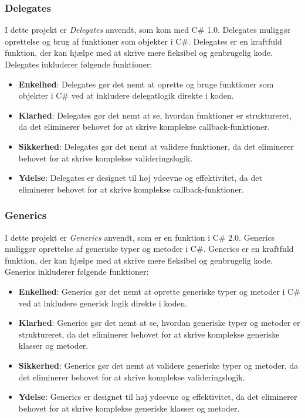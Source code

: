 \subsubsection{Delegates}
I dette projekt er \emph{Delegates} anvendt, som kom med C\# 1.0. Delegates muliggør oprettelse og brug af funktioner som objekter i C\#. Delegates er en kraftfuld funktion, der kan hjælpe med at skrive mere fleksibel og genbrugelig kode. Delegates inkluderer følgende funktioner:
\begin{itemize}
\item \textbf{Enkelhed}: Delegates gør det nemt at oprette og bruge funktioner som objekter i C\# ved at inkludere delegatlogik direkte i koden.
\item \textbf{Klarhed}: Delegates gør det nemt at se, hvordan funktioner er struktureret, da det eliminerer behovet for at skrive komplekse callback-funktioner.
\item \textbf{Sikkerhed}: Delegates gør det nemt at validere funktioner, da det eliminerer behovet for at skrive komplekse valideringslogik.
\item \textbf{Ydelse}: Delegates er designet til høj ydeevne og effektivitet, da det eliminerer behovet for at skrive komplekse callback-funktioner.
\end{itemize}

\subsubsection{Generics}
I dette projekt er \emph{Generics} anvendt, som er en funktion i C\# 2.0. Generics muliggør oprettelse af generiske typer og metoder i C\#. Generics er en kraftfuld funktion, der kan hjælpe med at skrive mere fleksibel og genbrugelig kode. Generics inkluderer følgende funktioner:
\begin{itemize}
\item \textbf{Enkelhed}: Generics gør det nemt at oprette generiske typer og metoder i C\# ved at inkludere generisk logik direkte i koden.
\item \textbf{Klarhed}: Generics gør det nemt at se, hvordan generiske typer og metoder er struktureret, da det eliminerer behovet for at skrive komplekse generiske klasser og metoder.
\item \textbf{Sikkerhed}: Generics gør det nemt at validere generiske typer og metoder, da det eliminerer behovet for at skrive komplekse valideringslogik.
\item \textbf{Ydelse}: Generics er designet til høj ydeevne og effektivitet, da det eliminerer behovet for at skrive komplekse generiske klasser og metoder.
\end{itemize}

